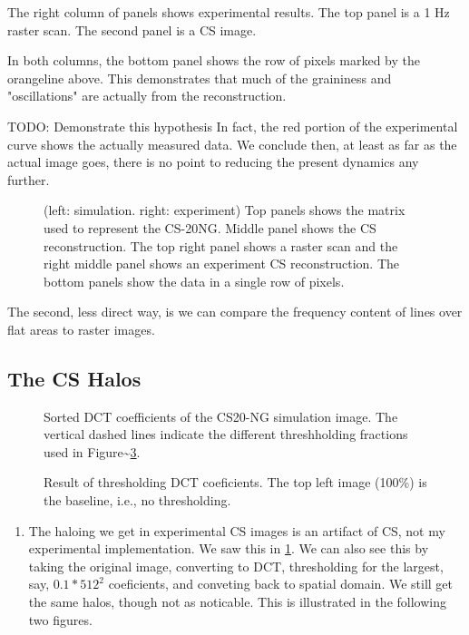 \documentclass[11pt]{article}
\begin{document}
The right column of panels shows experimental results. The top panel is a 1 Hz raster scan. The second panel is a CS image. 

In both columns, the bottom panel shows the row of pixels marked by the orangeline above. This demonstrates that much of the graininess and "oscillations" are actually from the reconstruction. 

TODO: Demonstrate this hypothesis
In fact, the red portion of the experimental curve shows the actually measured data.
We conclude then, at least as far as the actual image goes, there is no point to reducing the present dynamics any further. 


\begin{figure}[htbp]
\centering

\caption{\label{fig:cs_sim}
(left: simulation. right: experiment) Top panels shows the matrix used to represent the CS-20NG. Middle panel shows the CS reconstruction. The top right panel shows a raster scan and the right middle panel shows an experiment CS reconstruction. The bottom panels show the data in a single row of pixels.}
\end{figure}


The second, less direct way, is we can compare the frequency content of lines over flat areas to raster images. 



\subsection{The CS Halos \label{sec:halos}}
\label{sec:orgb0d53c2}
\begin{figure}[htbp]
\centering

\caption{\label{fig:cs20ng_dct}
Sorted DCT coefficients of the CS20-NG simulation image. The vertical dashed lines indicate the different threshholding fractions used in Figure\textasciitilde{}\ref{fig:cs20ng_thresh_img}.}
\end{figure}

\begin{figure}[htbp]
\centering

\caption{\label{fig:cs20ng_thresh_img}
Result of thresholding DCT coeficients. The top left image (100\%) is the baseline, i.e., no thresholding.}
\end{figure}

\begin{enumerate}
\item The haloing we get in experimental CS images is an artifact of CS, not my experimental implementation. We saw this in \ref{fig:cs_sim}. We can also see this by taking the original image, converting to DCT, thresholding for the largest, say, \(0.1*512^2\) coeficients, and conveting back to spatial domain. We still get the same halos, though not as noticable. This is illustrated in the following two figures.
\end{enumerate}
\end{document}

